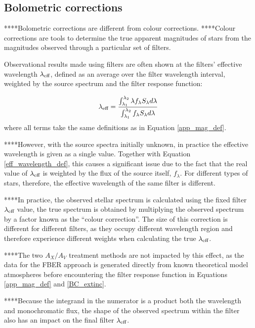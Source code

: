 \documentclass[12pt, a4paper]{report}
\begin{document}
\subsection{Bolometric corrections}

****Bolometric corrections are different from colour corrections. ****Colour corrections are tools to determine the true apparent magnitudes of stars from the magnitudes observed through a particular set of filters.

Observational results made using filters are often shown at the filters' effective wavelength $\lambda_{\textnormal{eff}}$, defined as an average over the filter wavelength interval, weighted by the source spectrum and the filter response function:

\begin{equation}
\lambda_{\textnormal{eff}} = \frac{ \int_{\lambda_{1}}^{\lambda_{2}} \lambda f_{\lambda} S_{\lambda} d\lambda }{ \int_{\lambda_{1}}^{\lambda_{2}} f_{\lambda} S_{\lambda} d\lambda }
\label{eff_wavelength_def}
\end{equation}
where all terms take the same definitions as in Equation \ref{app_mag_def}.

****However, with the source spectra initially unknown, in practice the effective wavelength is given as a single value. Together with Equation \ref{eff_wavelength_def}, this causes a significant issue due to the fact that the real value of $\lambda_{\textnormal{eff}}$ is weighted by the flux of the source itself, $f_{\lambda}$. For different types of stars, therefore, the effective wavelength of the same filter is different. 

****In practice, the observed stellar spectrum is calculated using the fixed filter $\lambda_{\textnormal{eff}}$ value, the true spectrum is obtained by multiplying the observed spectrum by a factor known as the ``colour correction''. The size of this correction is different for different filters, as they occupy different wavelength region and therefore experience different weights when calculating the true $\lambda_{\textnormal{eff}}$.

****The two $A_{X}/A_{V}$ treatment methods are not impacted by this effect, as the data for the FBER approach is generated directly from known theoretical model atmospheres before encountering the filter response function in Equations \ref{app_mag_def} and \ref{BC_extinc}.


****Because the integrand in the numerator is a product both the wavelength and monochromatic flux, the shape of the observed spectrum within the filter also has an impact on the final filter $\lambda_{\textnormal{eff}}$. 
\end{document}
